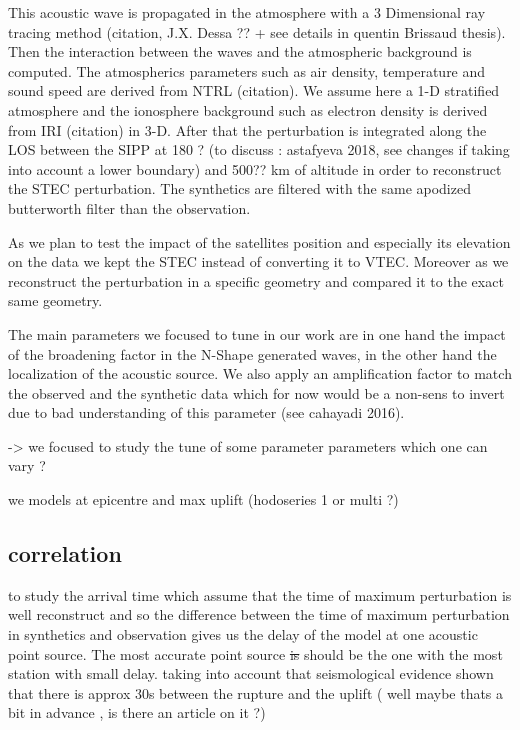 \documentclass{gji}
\begin{document}
         This  acoustic wave is propagated in the atmosphere with a 3 Dimensional ray tracing method (citation, J.X. Dessa ?? + see details in quentin Brissaud thesis). Then the interaction between the waves and the atmospheric background is computed. The atmospherics parameters such as air density, temperature and sound speed are derived from NTRL (citation). We assume here a 1-D stratified atmosphere and the ionosphere background such as electron density is derived from IRI (citation) in 3-D. After that  the perturbation is integrated along the LOS between the SIPP at 180 ? (to discuss : astafyeva 2018, see changes if taking into account a lower boundary) and 500?? km of altitude in order to reconstruct the STEC perturbation. 
		The synthetics are filtered with the same apodized butterworth filter than the observation.       
         
        As we plan to test the impact of the satellites position and especially its elevation on the data we kept the STEC instead of converting it to VTEC. Moreover as we reconstruct the perturbation in a specific geometry and compared it to the exact same geometry.
        
        The main parameters we focused to tune in our work are in one hand the impact of the broadening factor in the N-Shape generated waves, in the other hand the localization of the acoustic source. We also apply an amplification factor to match the observed and the synthetic data which for now would be a non-sens to invert due to bad understanding of this parameter (see cahayadi 2016).

             -> we focused to study the tune of some parameter parameters which one can vary ?

    we models at epicentre and max uplift (hodoseries 1 or multi ?)
    
    \subsection{correlation}
to study the arrival time which assume that the time of maximum perturbation is well reconstruct and so the difference between the time of maximum perturbation in synthetics and observation gives us the delay of the model at one acoustic point source. The most accurate point source \sout{is} should be the one with the most station with small delay.
taking into account that seismological evidence shown that there is approx 30s between the rupture and the uplift ( well maybe thats a bit in advance , is there an article on it ?) 
\end{document}
